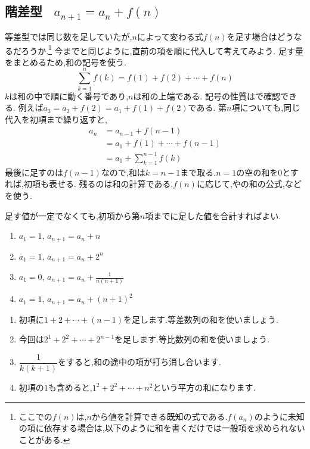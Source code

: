 
  \subsection{\texorpdfstring{階差型 \, $a_{n+1}=a_n+f(n)$}{階差型}}\label{節：階差型}
    等差型では同じ数を足していたが,$n$によって変わる式$f(n)$を足す場合はどうなるだろうか.\footnote{ここでの$f(n)$は,$n$から値を計算できる既知の式である.$f(a_n)$のように未知の項に依存する場合は,以下のように和を書くだけでは一般項を求められないことがある.}
    今までと同じように,直前の項を順に代入して考えてみよう.
    足す量をまとめるため,和の記号を使う.
    \[
      \sum_{k=1}^{n}f(k)=f(1)+f(2)+\cdots+f(n)
    \]
    $k$は和の中で順に動く番号であり,$n$は和の上端である.
    記号の性質はで確認できる.
    例えば$a_3=a_2+f(2)=a_1+f(1)+f(2)$である.
    第$n$項についても,同じ代入を初項まで繰り返すと,
    \begin{align*}
      a_n&=a_{n-1}+f(n-1)\\
         &=a_1+f(1)+\cdots+f(n-1)\\
         &=a_1+\sum_{k=1}^{n-1}f(k)
    \end{align*}
    最後に足すのは$f(n-1)$なので,和は$k=n-1$まで取る.$n=1$の空の和を$0$とすれば,初項も表せる.
    残るのは和の計算である.$f(n)$に応じて,やの和の公式,などを使う.
  \begin{bookpoint}
    足す値が一定でなくても,初項から第$n$項までに足した値を合計すればよい.
  \end{bookpoint}

    \noindent {}\par\nobreak
    \begin{enumerate}[label=(\arabic*),parsep=3pt,format=\bookitemlink{example-difference-1}{problem}{answer}]
      \item $\displaystyle a_1=1,\, a_{n+1}=a_n+n$
      \item $\displaystyle a_1=1,\, a_{n+1}=a_n+2^n$
      \item $\displaystyle a_1=0,\, a_{n+1}=a_n+\frac{1}{n(n+1)}$
      \item $\displaystyle a_1=1,\, a_{n+1}=a_n+(n+1)^2$
    \end{enumerate}

    \noindent{}\par\nobreak
    \begin{enumerate}[label=(\arabic*),parsep=3pt,format=\bookitemlink{example-difference-1}{hint}{problem}]
      \item 初項に$1+2+\cdots+(n-1)$を足します.等差数列の和を使いましょう.
      \item 今回は$2^1+2^2+\cdots+2^{n-1}$を足します.等比数列の和を使いましょう.
      \item $\dfrac{1}{k(k+1)}$をすると,和の途中の項が打ち消し合います.
      \item 初項の$1$も含めると,$1^2+2^2+\cdots+n^2$という平方の和になります.
    \end{enumerate}

